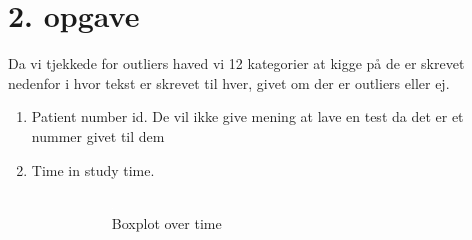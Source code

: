 \chapter{2. opgave}
Da vi tjekkede for outliers haved vi 12 kategorier at kigge på de er skrevet nedenfor i hvor tekst er skrevet til hver, givet om der er outliers eller ej.
\begin{enumerate}
\item Patient number id. \newline
De vil ikke give mening at lave en test da det er et nummer givet til dem 
\item  Time in study time.\\
\begin{figure}[H]
  \centering
  \begin{subfigure}[b]{0.49\textwidth}
    \includegraphics[width=\textwidth]{Basses_kode/Billeder_duration/Boxplot_of_ time .pdf}
    \caption{Boxplot over time}
    \label{fig:Residuals_plotted}
  \end{subfigure}
  \begin{subfigure}[b]{0.49\textwidth}

\end{subfigure}
\end{figure}
\end{enumerate}
